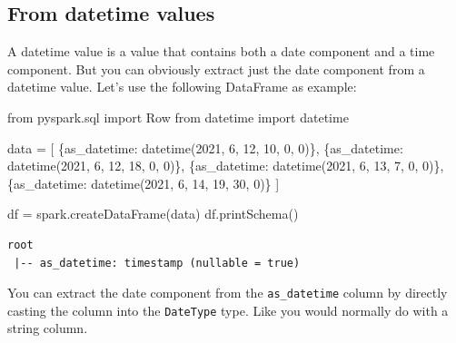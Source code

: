 \documentclass[
  11pt,
  letterpaper,
  DIV=11,
  numbers=noendperiod]{scrreprt}
\newenvironment{Shaded}{\begin{snugshade}}{\end{snugshade}}
\newcommand{\DecValTok}[1]{\textcolor[rgb]{0.68,0.00,0.00}{#1}}
\newcommand{\ImportTok}[1]{\textcolor[rgb]{0.00,0.46,0.62}{#1}}
\newcommand{\NormalTok}[1]{\textcolor[rgb]{0.00,0.23,0.31}{#1}}
\newcommand{\OperatorTok}[1]{\textcolor[rgb]{0.37,0.37,0.37}{#1}}
\newcommand{\StringTok}[1]{\textcolor[rgb]{0.13,0.47,0.30}{#1}}
\begin{document}
\subsection{From datetime values}\label{from-datetime-values}

A datetime value is a value that contains both a date component and a
time component. But you can obviously extract just the date component
from a datetime value. Let's use the following DataFrame as example:

\begin{Shaded}
\begin{Highlighting}[]
\ImportTok{from}\NormalTok{ pyspark.sql }\ImportTok{import}\NormalTok{ Row}
\ImportTok{from}\NormalTok{ datetime }\ImportTok{import}\NormalTok{ datetime}

\NormalTok{data }\OperatorTok{=}\NormalTok{ [}
\NormalTok{    \{}\StringTok{\textquotesingle{}as\_datetime\textquotesingle{}}\NormalTok{: datetime(}\DecValTok{2021}\NormalTok{, }\DecValTok{6}\NormalTok{, }\DecValTok{12}\NormalTok{, }\DecValTok{10}\NormalTok{, }\DecValTok{0}\NormalTok{, }\DecValTok{0}\NormalTok{)\},}
\NormalTok{    \{}\StringTok{\textquotesingle{}as\_datetime\textquotesingle{}}\NormalTok{: datetime(}\DecValTok{2021}\NormalTok{, }\DecValTok{6}\NormalTok{, }\DecValTok{12}\NormalTok{, }\DecValTok{18}\NormalTok{, }\DecValTok{0}\NormalTok{, }\DecValTok{0}\NormalTok{)\},}
\NormalTok{    \{}\StringTok{\textquotesingle{}as\_datetime\textquotesingle{}}\NormalTok{: datetime(}\DecValTok{2021}\NormalTok{, }\DecValTok{6}\NormalTok{, }\DecValTok{13}\NormalTok{, }\DecValTok{7}\NormalTok{, }\DecValTok{0}\NormalTok{, }\DecValTok{0}\NormalTok{)\},}
\NormalTok{    \{}\StringTok{\textquotesingle{}as\_datetime\textquotesingle{}}\NormalTok{: datetime(}\DecValTok{2021}\NormalTok{, }\DecValTok{6}\NormalTok{, }\DecValTok{14}\NormalTok{, }\DecValTok{19}\NormalTok{, }\DecValTok{30}\NormalTok{, }\DecValTok{0}\NormalTok{)\}}
\NormalTok{]}

\NormalTok{df }\OperatorTok{=}\NormalTok{ spark.createDataFrame(data)}
\NormalTok{df.printSchema()}
\end{Highlighting}
\end{Shaded}

\begin{verbatim}
root
 |-- as_datetime: timestamp (nullable = true)
\end{verbatim}

You can extract the date component from the \texttt{as\_datetime} column
by directly casting the column into the \texttt{DateType} type. Like you
would normally do with a string column.
\end{document}
